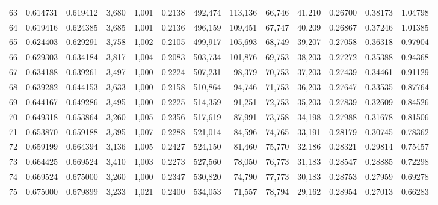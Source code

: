 \begin{tabular}{rrrrrrrrrrrrr}
63  &  0.614731 &  0.619412 &   3,680 &  1,001 &                                     0.2138 &  492,474 &  113,136 &   66,746 &   41,210 &  0.26700 &  0.38173 &  1.04798 \\
64  &  0.619416 &  0.624385 &   3,685 &  1,001 &                                     0.2136 &  496,159 &  109,451 &   67,747 &   40,209 &  0.26867 &  0.37246 &  1.01385 \\
65  &  0.624403 &  0.629291 &   3,758 &  1,002 &                                     0.2105 &  499,917 &  105,693 &   68,749 &   39,207 &  0.27058 &  0.36318 &  0.97904 \\
66  &  0.629303 &  0.634184 &   3,817 &  1,004 &                                     0.2083 &  503,734 &  101,876 &   69,753 &   38,203 &  0.27272 &  0.35388 &  0.94368 \\
67  &  0.634188 &  0.639261 &   3,497 &  1,000 &                                     0.2224 &  507,231 &   98,379 &   70,753 &   37,203 &  0.27439 &  0.34461 &  0.91129 \\
68  &  0.639282 &  0.644153 &   3,633 &  1,000 &                                     0.2158 &  510,864 &   94,746 &   71,753 &   36,203 &  0.27647 &  0.33535 &  0.87764 \\
69  &  0.644167 &  0.649286 &   3,495 &  1,000 &                                     0.2225 &  514,359 &   91,251 &   72,753 &   35,203 &  0.27839 &  0.32609 &  0.84526 \\
70  &  0.649318 &  0.653864 &   3,260 &  1,005 &                                     0.2356 &  517,619 &   87,991 &   73,758 &   34,198 &  0.27988 &  0.31678 &  0.81506 \\
71  &  0.653870 &  0.659188 &   3,395 &  1,007 &                                     0.2288 &  521,014 &   84,596 &   74,765 &   33,191 &  0.28179 &  0.30745 &  0.78362 \\
72  &  0.659199 &  0.664394 &   3,136 &  1,005 &                                     0.2427 &  524,150 &   81,460 &   75,770 &   32,186 &  0.28321 &  0.29814 &  0.75457 \\
73  &  0.664425 &  0.669524 &   3,410 &  1,003 &                                     0.2273 &  527,560 &   78,050 &   76,773 &   31,183 &  0.28547 &  0.28885 &  0.72298 \\
74  &  0.669524 &  0.675000 &   3,260 &  1,000 &                                     0.2347 &  530,820 &   74,790 &   77,773 &   30,183 &  0.28753 &  0.27959 &  0.69278 \\
75  &  0.675000 &  0.679899 &   3,233 &  1,021 &                                     0.2400 &  534,053 &   71,557 &   78,794 &   29,162 &  0.28954 &  0.27013 &  0.66283 \\

\end{tabular}
